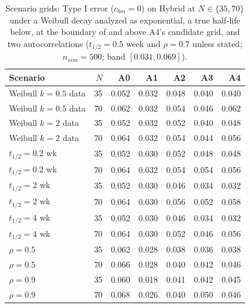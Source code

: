 \documentclass[
  11pt,
]{article}
\begin{document}
\begin{table}
\centering
\caption{\label{tab:stage4-grid-null}Scenario grids: Type I error ($c_{bm} = 0$) on
    Hybrid at $N \in \{35, 70\}$ under a Weibull decay analyzed as
    exponential, a true half-life below, at the boundary of and above
    A4's candidate grid, and two autocorrelations ($t_{1/2} = 0.5$ week and $\rho = 0.7$ unless
    stated; $n_{sim} = 500$; band $[0.031, 0.069]$).}
\centering
\fontsize{9}{11}\selectfont
\begin{tabular}[t]{lrrrrrr}
\toprule
Scenario & $N$ & A0 & A1 & A2 & A3 & A4\\
\midrule
Weibull $k = 0.5$ data & 35 & 0.052 & 0.032 & 0.048 & 0.040 & 0.040\\
Weibull $k = 0.5$ data & 70 & 0.062 & 0.032 & 0.054 & 0.046 & 0.062\\
Weibull $k = 2$ data & 35 & 0.052 & 0.032 & 0.052 & 0.040 & 0.048\\
Weibull $k = 2$ data & 70 & 0.064 & 0.032 & 0.054 & 0.044 & 0.056\\
$t_{1/2} = 0.2$ wk & 35 & 0.052 & 0.030 & 0.052 & 0.048 & 0.048\\
\addlinespace
$t_{1/2} = 0.2$ wk & 70 & 0.064 & 0.032 & 0.054 & 0.054 & 0.056\\
$t_{1/2} = 2$ wk & 35 & 0.052 & 0.030 & 0.046 & 0.034 & 0.032\\
$t_{1/2} = 2$ wk & 70 & 0.064 & 0.030 & 0.056 & 0.052 & 0.058\\
$t_{1/2} = 4$ wk & 35 & 0.052 & 0.030 & 0.046 & 0.034 & 0.032\\
$t_{1/2} = 4$ wk & 70 & 0.064 & 0.030 & 0.052 & 0.046 & 0.056\\
\addlinespace
$\rho = 0.5$ & 35 & 0.062 & 0.028 & 0.038 & 0.036 & 0.038\\
$\rho = 0.5$ & 70 & 0.066 & 0.028 & 0.040 & 0.042 & 0.046\\
$\rho = 0.9$ & 35 & 0.060 & 0.018 & 0.041 & 0.042 & 0.045\\
$\rho = 0.9$ & 70 & 0.068 & 0.026 & 0.040 & 0.050 & 0.046\\
\bottomrule
\end{tabular}
\end{table}
\end{document}
